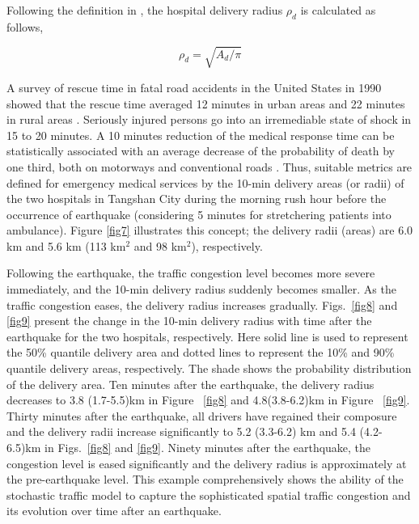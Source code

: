 \documentclass[review,11pt,nonatbib]{elsarticle}
\begin{document}
\par Following the definition in \citep{feng2017post}, the hospital delivery radius $\rho_d$ is calculated as follows, 

\begin{equation}\label{delivery_radius}
\rho_d = \sqrt{A_d/\pi}
\end{equation}

A survey of rescue time in fatal road accidents in the United States in 1990 showed that the rescue time averaged 12 minutes in urban areas and 22 minutes in rural areas \citep{brodsky1990emergency}. Seriously injured persons go into an irremediable state of shock in 15 to 20 minutes. A 10 minutes reduction of the medical response time can be statistically associated with an average decrease of the probability of death by one third, both on motorways and conventional roads \citep{sanchez2010probability}. Thus, suitable metrics are defined for emergency medical services by the 10-min delivery areas (or radii) of the two hospitals in Tangshan City during the morning rush hour before the occurrence of earthquake (considering 5 minutes for stretchering patients into ambulance). Figure \ref{fig7} illustrates this concept; the delivery radii (areas) are 6.0 km and 5.6 km (113 km$^2$ and 98 km$^2$), respectively. 

Following the earthquake, the traffic congestion level becomes more severe immediately, and the 10-min delivery radius suddenly becomes smaller. As the traffic congestion eases, the delivery radius increases gradually. Figs.~\ref{fig8} and \ref{fig9} present the change in the 10-min delivery radius with time after the earthquake for the two hospitals, respectively. Here  solid line is used to represent the 50\% quantile delivery area and dotted lines to represent the 10\% and 90\% quantile delivery areas, respectively. The shade shows the probability distribution of the delivery area. Ten minutes after the earthquake, the delivery radius decreases to 3.8 (1.7-5.5)km in Figure ~\ref{fig8} and 4.8(3.8-6.2)km in Figure ~\ref{fig9}. Thirty minutes after the earthquake, all drivers have regained their composure and the delivery radii increase significantly to 5.2 (3.3-6.2) km and 5.4 (4.2-6.5)km in Figs.~\ref{fig8} and \ref{fig9}. Ninety minutes after the earthquake, the congestion level is eased significantly and the delivery radius is approximately at the pre-earthquake level. This example comprehensively shows the ability of the stochastic traffic model to capture the sophisticated spatial traffic congestion and its evolution over time after an earthquake.   
\end{document}
